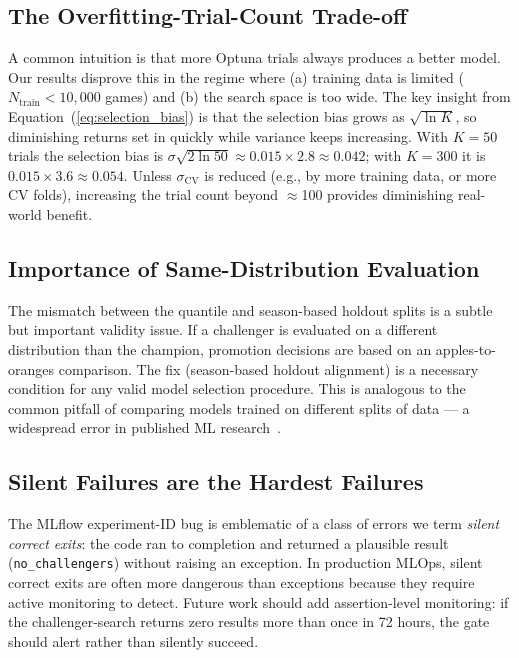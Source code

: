 \documentclass[conference]{IEEEtran}
\begin{document}
\subsection{The Overfitting-Trial-Count Trade-off}

A common intuition is that more Optuna trials always produces a
better model.  Our results disprove this in the regime where (a)
training data is limited ($N_\text{train} < 10{,}000$ games) and (b)
the search space is too wide.  The key insight from
Equation~(\ref{eq:selection_bias}) is that the selection bias grows
as $\sqrt{\ln K}$, so diminishing returns set in quickly while
variance keeps increasing.  With $K{=}50$ trials the selection bias
is $\sigma\sqrt{2\ln 50} \approx 0.015 \times 2.8 \approx 0.042$;
with $K{=}300$ it is $0.015 \times 3.6 \approx 0.054$.  Unless
$\sigma_\text{CV}$ is reduced (e.g., by more training data, or more
CV folds), increasing the trial count beyond $\approx$100 provides
diminishing real-world benefit.

\subsection{Importance of Same-Distribution Evaluation}

The mismatch between the quantile and season-based holdout splits is
a subtle but important validity issue.  If a challenger is evaluated
on a different distribution than the champion, promotion decisions
are based on an apples-to-oranges comparison.  The fix (season-based
holdout alignment) is a necessary condition for any valid model
selection procedure.  This is analogous to the common pitfall of
comparing models trained on different splits of data — a widespread
error in published ML
research~\cite{kapoor2023}.

\subsection{Silent Failures are the Hardest Failures}

The MLflow experiment-ID bug is emblematic of a class of errors we
term \emph{silent correct exits}: the code ran to completion and
returned a plausible result (\texttt{no\_challengers}) without
raising an exception.  In production MLOps, silent correct exits are
often more dangerous than exceptions because they require active
monitoring to detect.  Future work should add assertion-level
monitoring: if the challenger-search returns zero results more than
once in 72 hours, the gate should alert rather than silently succeed.
\end{document}
